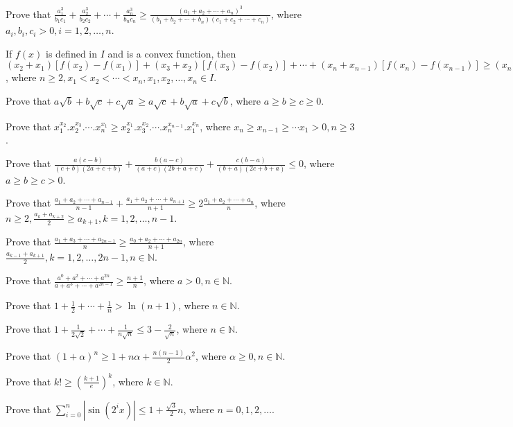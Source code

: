 \item Prove that $\frac{a_1^3}{b_1c_1} + \frac{a_2^3}{b_2c_2} + \cdots + \frac{a_n^3}{b_nc_n}\geq \frac{(a_1 + a_2 + \cdots +
  a_n)^3}{(b_1 + b_2 + \cdots + b_n)(c_1 + c_2 + \cdots + c_n)}$, where $a_i, b_i, c_i > 0, i = 1, 2, \ldots, n$.
\item If $f(x)$ is defined in $I$ and is a convex function, then $(x_2 + x_1)[f(x_2) - f(x_1)] + (x_3 + x_2)[f(x_3) - f(x_2)] +
  \cdots + (x_n + x_{n - 1})[f(x_{n}) - f(x_{n - 1})]\geq (x_n + x_1)[f(x_n) - f(x_{n - 1})]$, where $n\geq 2, x_1 < x_2 < \cdots <
  x_n, x_1, x_2, \ldots, x_n\in I$.
\item Prove that $a\sqrt{b} + b\sqrt{c} + c\sqrt{a}\geq a\sqrt{c} + b\sqrt{a} + c\sqrt{b}$, where $a\geq b\geq c\geq 0$.
\item Prove that $x_1^{x_2}.x_2^{x_3}.\cdots.x_n^{x_1}\geq x_2^{x_1}.x_3^{x_2}.\cdots.x_n^{x_{n - 1}}.x_1^{x_n}$, where $x_n\geq
  x_{n - 1}\geq \cdots x_1 > 0, n\geq 3$.
\item Prove that $\frac{a(c - b)}{(c + b)(2a + c + b)} + \frac{b(a - c)}{(a + c)(2b + a + c)} + \frac{c(b - a)}{(b + a)(2c + b +
  a)}\leq 0$, where $a\geq b\geq c > 0$.
\item Prove that $\frac{a_1 + a_2 + \cdots + a_{n - 1}}{n - 1} + \frac{a_1 + a_2 + \cdots + a_{n + 1}}{n + 1}\geq 2\frac{a_1 + a_2
  + \cdots + a_n}{n}$, where $n\geq 2, \frac{a_k + a_{k + 2}}{2}\geq a_{k + 1}, k = 1, 2, \ldots, n - 1$.
\item Prove that $\frac{a_1 + a_3 + \cdots + a_{2n - 1}}{n}\geq \frac{a_0 + a_2 + \cdots + a_{2n}}{n + 1}$, where $\frac{a_{k - 1}
  + a_{k + 1}}{2}, k = 1, 2, \ldots, 2n - 1, n\in\mathbb{N}$.
\item Prove that $\frac{a^0 + a^2 + \cdots + a^{2n}}{a + a^3 + \cdots + a^{2n - 1}}\geq \frac{n + 1}{n}$, where $a > 0,
  n\in\mathbb{N}$.
\item Prove that $1 + \frac{1}{2} + \cdots + \frac{1}{n} > \ln(n + 1)$, where $n\in\mathbb{N}$.
\item Prove that $1 + \frac{1}{2\sqrt{2}} + \cdots + \frac{1}{n\sqrt{n}}\leq 3 - \frac{2}{\sqrt{n}}$, where $n\in\mathbb{N}$.
\item Prove that $(1 + \alpha)^n \geq 1 + n\alpha + \frac{n(n - 1)}{2}\alpha^2$, where $\alpha\geq 0, n\in\mathbb{N}$.
\item Prove that $k!\geq \left(\frac{k + 1}{e}\right)^k$, where $k\in\mathbb{N}$.
\item Prove that $\displaystyle\sum_{i=0}^n\left|\sin(2^ix)\right|\leq 1 + \frac{\sqrt{3}}{2}n$, where $n = 0, 1, 2, \ldots$.
